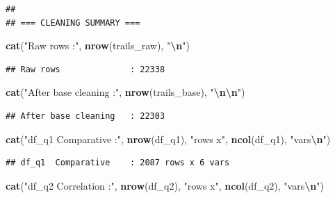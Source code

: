 \documentclass[
]{article}
\newenvironment{Shaded}{\begin{snugshade}}{\end{snugshade}}
\newcommand{\FunctionTok}[1]{\textcolor[rgb]{0.13,0.29,0.53}{\textbf{#1}}}
\newcommand{\NormalTok}[1]{#1}
\newcommand{\SpecialCharTok}[1]{\textcolor[rgb]{0.81,0.36,0.00}{\textbf{#1}}}
\newcommand{\StringTok}[1]{\textcolor[rgb]{0.31,0.60,0.02}{#1}}
\begin{document}
\begin{verbatim}
## 
## === CLEANING SUMMARY ===
\end{verbatim}

\begin{Shaded}
\begin{Highlighting}[]
\FunctionTok{cat}\NormalTok{(}\StringTok{"Raw rows              :"}\NormalTok{, }\FunctionTok{nrow}\NormalTok{(trails\_raw), }\StringTok{"}\SpecialCharTok{\textbackslash{}n}\StringTok{"}\NormalTok{)}
\end{Highlighting}
\end{Shaded}

\begin{verbatim}
## Raw rows              : 22338
\end{verbatim}

\begin{Shaded}
\begin{Highlighting}[]
\FunctionTok{cat}\NormalTok{(}\StringTok{"After base cleaning   :"}\NormalTok{, }\FunctionTok{nrow}\NormalTok{(trails\_base), }\StringTok{"}\SpecialCharTok{\textbackslash{}n\textbackslash{}n}\StringTok{"}\NormalTok{)}
\end{Highlighting}
\end{Shaded}

\begin{verbatim}
## After base cleaning   : 22303
\end{verbatim}

\begin{Shaded}
\begin{Highlighting}[]
\FunctionTok{cat}\NormalTok{(}\StringTok{"df\_q1  Comparative    :"}\NormalTok{, }\FunctionTok{nrow}\NormalTok{(df\_q1), }\StringTok{"rows x"}\NormalTok{, }\FunctionTok{ncol}\NormalTok{(df\_q1), }\StringTok{"vars}\SpecialCharTok{\textbackslash{}n}\StringTok{"}\NormalTok{)}
\end{Highlighting}
\end{Shaded}

\begin{verbatim}
## df_q1  Comparative    : 2087 rows x 6 vars
\end{verbatim}

\begin{Shaded}
\begin{Highlighting}[]
\FunctionTok{cat}\NormalTok{(}\StringTok{"df\_q2  Correlation    :"}\NormalTok{, }\FunctionTok{nrow}\NormalTok{(df\_q2), }\StringTok{"rows x"}\NormalTok{, }\FunctionTok{ncol}\NormalTok{(df\_q2), }\StringTok{"vars}\SpecialCharTok{\textbackslash{}n}\StringTok{"}\NormalTok{)}
\end{Highlighting}
\end{Shaded}
\end{document}
